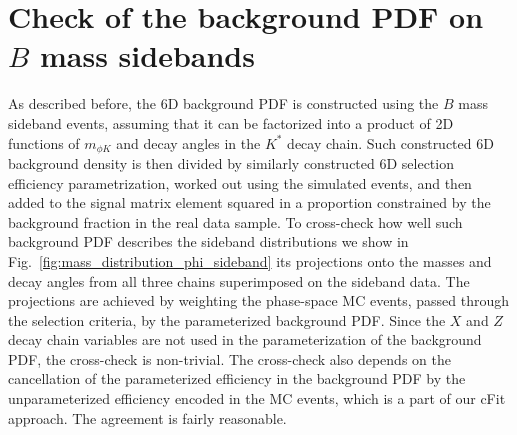
\section{Check of the background PDF on $B$ mass sidebands}
\label{SUPPsec:app_B_sideband}

As described before, the 6D background PDF is constructed using
the $B$ mass sideband events, assuming that it can be factorized into a product of
2D functions of $m_{\phi K}$ and decay angles in the $K^*$ decay chain.
Such constructed 6D background density is then divided by similarly constructed
6D selection efficiency parametrization, worked out using the simulated events,
and then added to the signal matrix element squared
in a proportion constrained by the background fraction in the real data sample.
To cross-check how well such background PDF describes the sideband distributions
we show in Fig.~\ref{fig:mass_distribution_phi_sideband}
its projections onto the masses and decay angles from
all three chains superimposed on the sideband data.
The projections are achieved by weighting the phase-space MC events, passed
through the selection criteria, by the parameterized background PDF.
Since the $X$ and $Z$ decay chain variables are not used in the parameterization of the background PDF,
the cross-check is non-trivial.
The cross-check also depends on the cancellation of the parameterized efficiency in the background PDF
by the unparameterized efficiency encoded in the MC events, which is a part of our cFit approach.
The agreement is fairly reasonable.

